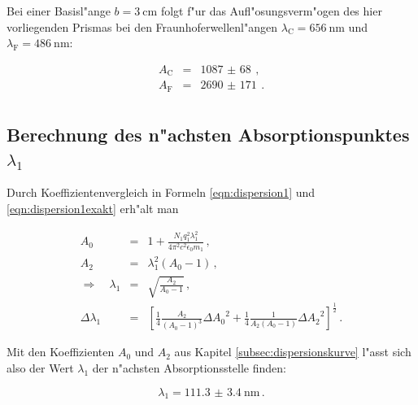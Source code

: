 		\clearpage

		Bei einer Basisl"ange $b = \SI{3}{\centi \meter}$ folgt f"ur das Aufl"osungsverm"ogen des hier vorliegenden Prismas bei den Fraunhoferwellenl"angen $\lambda_\mathrm{C} = \SI{656}{\nano \meter}$ und $\lambda_\mathrm{F} = \SI{486}{\nano \meter}$:

		\begin{eqnarray*}
			A_\mathrm{C} & = & \SI{1087(68)}{} \,, \\
			A_\mathrm{F} & = & \SI{2690(171)}{} \,. \\
		\end{eqnarray*}

	\subsection{Berechnung des n"achsten Absorptionspunktes $\lambda_\mathrm{1}$}
	\label{subsec:absorptionspunkt}
		Durch Koeffizientenvergleich in Formeln \eqref{eqn:dispersion1} und \eqref{eqn:dispersion1exakt} erh"alt man

		\begin{eqnarray*}
			A_0 & = & 1 + \frac{N_1 q_1^2 \lambda_1^2}{4 \pi^2 c^2 \epsilon_0 m_1} \,, \\
			A_2 & = & \lambda_1^2 (A_0 - 1) \,, \\
			\Rightarrow \quad \lambda_1 & = & \sqrt{\frac{A_2}{A_0 - 1}} \,, \\
			\Delta \lambda_1 & = & \left[\frac{1}{4}\frac{A_2}{(A_0 - 1)^3} \Delta {A_0}^2 + \frac{1}{4}\frac{1}{A_2 (A_0 - 1)} \Delta {A_2}^2\right]^\frac{1}{2} \,.
		\end{eqnarray*}

		Mit den Koeffizienten $A_0$ und $A_2$ aus Kapitel \ref{subsec:dispersionskurve} l"asst sich also der Wert $\lambda_1$ der n"achsten Absorptionsstelle finden:

		\begin{equation*}
			\lambda_1 = \SI{111.3(34)}{\nano \meter} \,.
		\end{equation*}
